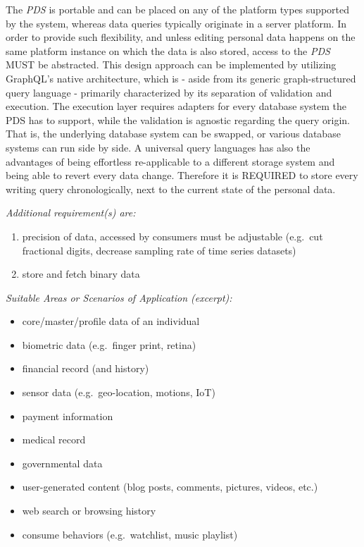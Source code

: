 \documentclass[12pt,english,a4paper,titlepage,cleardoublepage=empty,dottedtoc]{report}
\providecommand{\tightlist}{%
  \setlength{\itemsep}{0pt}\setlength{\parskip}{0pt}}
\begin{document}
The \emph{PDS} is portable and can be placed on any of the platform
types supported by the system, whereas data queries typically originate
in a server platform. In order to provide such flexibility, and unless
editing personal data happens on the same platform instance on which the
data is also stored, access to the \emph{PDS} MUST be abstracted. This
design approach can be implemented by utilizing GraphQL's native
architecture, which is - aside from its generic graph-structured query
language - primarily characterized by its separation of validation and
execution. The execution layer requires adapters for every database
system the PDS has to support, while the validation is agnostic
regarding the query origin. That is, the underlying database system can
be swapped, or various database systems can run side by side. A
universal query languages has also the advantages of being effortless
re-applicable to a different storage system and being able to revert
every data change. Therefore it is REQUIRED to store every writing query
chronologically, next to the current state of the personal data.

\emph{Additional requirement(s) are:}

\begin{enumerate}
\def\labelenumi{\alph{enumi})}
\tightlist
\item
  precision of data, accessed by consumers must be adjustable (e.g.~cut
  fractional digits, decrease sampling rate of time series datasets)\\
\item
  store and fetch binary data
\end{enumerate}

\emph{Suitable Areas or Scenarios of Application (excerpt):}

\begin{itemize}
\tightlist
\item
  core/master/profile data of an individual
\item
  biometric data (e.g.~finger print, retina)
\item
  financial record (and history)
\item
  sensor data (e.g.~geo-location, motions, IoT)
\item
  payment information
\item
  medical record
\item
  governmental data
\item
  user-generated content (blog posts, comments, pictures, videos, etc.)
\item
  web search or browsing history
\item
  consume behaviors (e.g.~watchlist, music playlist)
\end{itemize}
\end{document}
